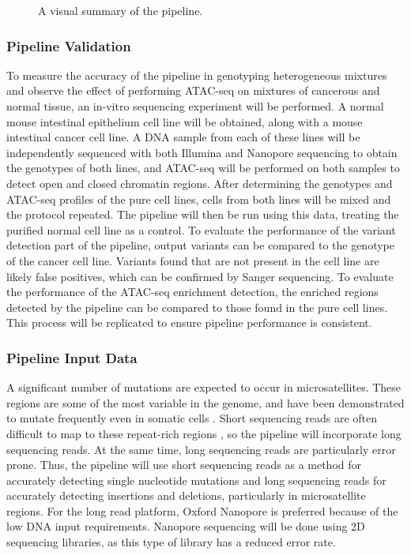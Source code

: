 \begin{figure}[h]
\centering
\caption{A visual summary of the pipeline.}
\label{fig:pipeline}
\end{figure}

\subsubsection{Pipeline Validation}

To measure the accuracy of the pipeline in genotyping heterogeneous mixtures and observe the effect of performing ATAC-seq on mixtures of cancerous and normal tissue, an in-vitro sequencing experiment will be performed. A normal mouse intestinal epithelium cell line will be obtained, along with a mouse intestinal cancer cell line. A DNA sample from each of these lines will be independently sequenced with both Illumina and Nanopore sequencing to obtain the genotypes of both lines, and ATAC-seq will be performed on both samples to detect open and closed chromatin regions. After determining the genotypes and ATAC-seq profiles of the pure cell lines, cells from both lines will be mixed and the protocol repeated. The pipeline will then be run using this data, treating the purified normal cell line as a control. To evaluate the performance of the variant detection part of the pipeline, output variants can be compared to the genotype of the cancer cell line. Variants found that are not present in the cell line are likely false positives, which can be confirmed by Sanger sequencing. To evaluate the performance of the ATAC-seq enrichment detection, the enriched regions detected by the pipeline can be compared to those found in the pure cell lines.
This process will be replicated to ensure pipeline performance is consistent. 

\subsubsection{Pipeline Input Data} 
A significant number of mutations are expected to occur in microsatellites.
These regions are some of the most variable in the genome, and have been demonstrated to mutate frequently even in somatic cells \parencite{behjati_genome_2014}.
Short sequencing reads are often difficult to map to these repeat-rich regions \parencite{maruvka_analysis_2017}, so the pipeline will incorporate long sequencing reads. At the same time, long sequencing reads are particularly error prone. Thus, the pipeline will use short sequencing reads as a method for accurately detecting single nucleotide mutations and long sequencing reads for accurately detecting insertions and deletions, particularly in microsatellite regions.
For the long read platform, Oxford Nanopore is preferred because of the low DNA input requirements.
Nanopore sequencing will be done using 2D sequencing libraries, as this type of library has a reduced error rate.

